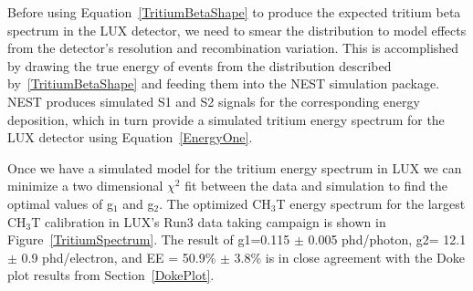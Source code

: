 Before using Equation~\ref{TritiumBetaShape} to produce the expected tritium beta spectrum in the LUX detector, we need to smear the distribution to model effects from the detector's resolution and recombination variation.  This is accomplished by drawing the true energy of events from the distribution described by~\ref{TritiumBetaShape} and feeding them into the NEST simulation package.  NEST produces simulated S1 and S2 signals for the corresponding energy deposition, which in turn provide a simulated tritium energy spectrum for the LUX detector using Equation~\ref{EnergyOne}.

Once we have a simulated model for the tritium energy spectrum in LUX we can minimize a two dimensional $\chi^2$ fit between the data and simulation to find the optimal values of g$_1$ and g$_2$.  The optimized CH$_3$T energy spectrum for the largest CH$_3$T calibration in LUX's Run3 data taking campaign is shown in Figure~\ref{TritiumSpectrum}.	The result of g1=0.115 $\pm$ 0.005 phd/photon, g2= 12.1 $\pm$ 0.9 phd/electron, and EE = 50.9\% $\pm$ 3.8\% is in close agreement with the Doke plot results from Section~\ref{DokePlot}.
